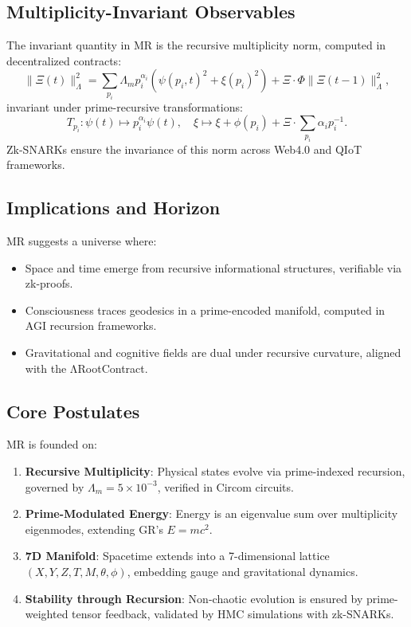\documentclass{article}
\theoremstyle{plain}
\begin{document}
\subsection{Multiplicity-Invariant Observables}

The invariant quantity in MR is the recursive multiplicity norm, computed in decentralized contracts:
\begin{equation}
    \| \Xi(t) \|_{\Lambda}^2 = \sum_{p_i} \Lambda_m p_i^{\alpha_i} \left( \psi(p_i, t)^2 + \xi(p_i)^2 \right) + \Xi \cdot \Phi \| \Xi(t-1) \|_{\Lambda}^2,
\end{equation}
invariant under prime-recursive transformations:
\[
T_{p_i} : \psi(t) \mapsto p_i^{\alpha_i} \psi(t), \quad \xi \mapsto \xi + \phi(p_i) + \Xi \cdot \sum_{p_i} \alpha_i p_i^{-1}.
\]
Zk-SNARKs ensure the invariance of this norm across Web4.0 and QIoT frameworks.

\subsection{Implications and Horizon}

MR suggests a universe where:
\begin{itemize}
    \item Space and time emerge from recursive informational structures, verifiable via zk-proofs.
    \item Consciousness traces geodesics in a prime-encoded manifold, computed in AGI recursion frameworks.
    \item Gravitational and cognitive fields are dual under recursive curvature, aligned with the ΛRootContract.
\end{itemize}

\subsection{Core Postulates}

MR is founded on:
\begin{enumerate}
    \item \textbf{Recursive Multiplicity}: Physical states evolve via prime-indexed recursion, governed by \(\Lambda_m = 5 \times 10^{-3}\), verified in Circom circuits.
    \item \textbf{Prime-Modulated Energy}: Energy is an eigenvalue sum over multiplicity eigenmodes, extending GR’s \(E = mc^2\).
    \item \textbf{7D Manifold}: Spacetime extends into a 7-dimensional lattice \((X, Y, Z, T, M, \theta, \phi)\), embedding gauge and gravitational dynamics.
    \item \textbf{Stability through Recursion}: Non-chaotic evolution is ensured by prime-weighted tensor feedback, validated by HMC simulations with zk-SNARKs.
\end{enumerate}
\end{document}
